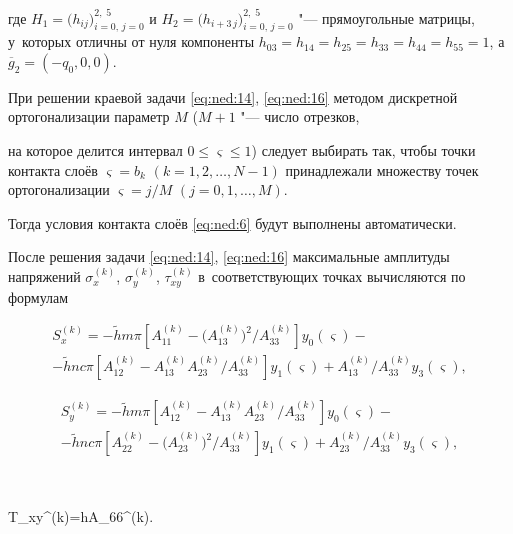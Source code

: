 где $H_1=\bigl(h_{i j} \bigr)_{i=0,\, j=0}^{2,\; 5}$ и $H_2=\bigl(h_{i+3\,j} \bigr)_{i=0,\, j=0}^{2,\; 5}$  "--- прямоугольные матрицы, у~которых отличны от нуля компоненты $h_{03}=h_{14}=h_{25}=h_{33}=h_{44}=h_{55}=1$, а~$\overline g_2=(-q_0, 0, 0)$.



При решении краевой задачи \eqref{eq:ned:14}, \eqref{eq:ned:16} методом дискретной ортогонализации параметр $M$  ($M{+}1$ "--- число отрезков,

на которое делится интервал $0\le\varsigma\le 1$) следует выбирать так, чтобы точки контакта слоёв $\varsigma=b_k$ $(k=1, 2, \dots, N-1)$ принадлежали множеству точек ортогонализации $\varsigma=j/M$ $(j=0, 1, \dots, M)$. 

Тогда условия контакта слоёв \eqref{eq:ned:6} будут выполнены автоматически.



После решения задачи \eqref{eq:ned:14}, \eqref{eq:ned:16} максимальные амплитуды напряжений $\sigma_x^{(k)}$, $\sigma_y^{(k)}$, $\tau_{xy}^{(k)}$ в~соответствующих точках вычисляются по формулам

\begin{multline*}

S_x^{(k)}=-\tilde hm\pi\left[ A_{11}^{(k)} -\bigl(A_{13}^{(k)}\bigr)^2 /A_{33}^{(k)} \right]y_0(\varsigma)-\\

%

-\tilde hnc\pi\left[ A_{12}^{(k)} -A_{13}^{(k)} A_{23}^{(k)}/ A_{33}^{(k)} \right]y_1(\varsigma)+

{A_{13}^{(k)} / A_{33}^{(k)} y_3(\varsigma)},

\end{multline*}

%

\begin{multline*}

S_y^{(k)}=-\tilde hm\pi\left[ A_{12}^{(k)} -A_{13}^{(k)} A_{23}^{(k)} / A_{33}^{(k)} \right]y_0(\varsigma)-\\

-\tilde hnc\pi\left[ A_{22}^{(k)} -\bigl(A_{23}^{(k)} \bigr)^2 / A_{33}^{(k)} \right] y_1(\varsigma)+A_{23}^{(k)}/A_{33}^{(k)} y_3(\varsigma),

\end{multline*}


$$

T_{xy}^{(k)}=\tilde h\pi A_{66}^{(k)}.

